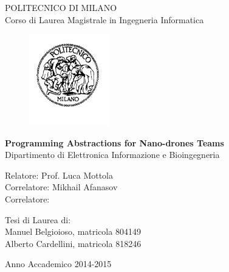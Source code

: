 \thispagestyle{empty}
\vspace*{-1.5cm} \bfseries{
\begin{center}
  \large
  POLITECNICO DI MILANO\\
  \normalsize
  Corso di Laurea Magistrale in Ingegneria Informatica\\
  
  \begin{figure}[htbp]
    \begin{center}
      \includegraphics[width=3.5cm]{./pictures/logopm}
    \end{center}
  \end{figure}
  \vspace*{0.3cm} \LARGE



  \textbf{Programming Abstractions for Nano-drones Teams}\\



  \vspace*{.75truecm} \large
  Dipartimento di Elettronica Informazione e Bioingegneria\\
\end{center}
\vspace*{3.0cm} \large
\begin{flushleft}


  Relatore: Prof. Luca Mottola \\
  Correlatore:  Mikhail Afanasov\\
  Correlatore:  \\


\end{flushleft}
\vspace*{1.0cm}
\begin{flushright}


  Tesi di Laurea di:\\ Manuel Belgioioso, matricola 804149 \\ 
		       Alberto Cardellini, matricola 818246  \\


\end{flushright}
\vspace*{0.5cm}
\begin{center}



  Anno Accademico 2014-2015
\end{center} \clearpage
}